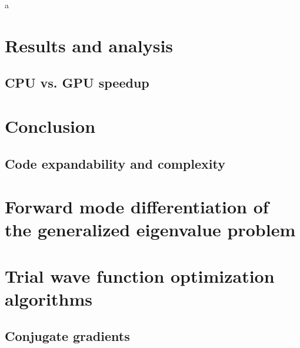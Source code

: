 \documentclass[final,3p,times,twocolumn]{elsarticle}
\begin{document}
	\newpage
		a
	\newpage
	\section{Results and analysis}
	\label{sec:results}


	\subsection{CPU vs. GPU speedup}
	
	
	\newpage
	\section{Conclusion}
	\label{sec:conclusion}
	
	\subsection{Code expandability and complexity}
		
	
	
	
	
	\appendix
	
	\section{Forward mode differentiation of the generalized eigenvalue problem}
	\label{app:GenEigGrad}
	
	\section{Trial wave function optimization algorithms}
	\label{app:optmethods}
	\subsection{Conjugate gradients}
	
\end{document}
